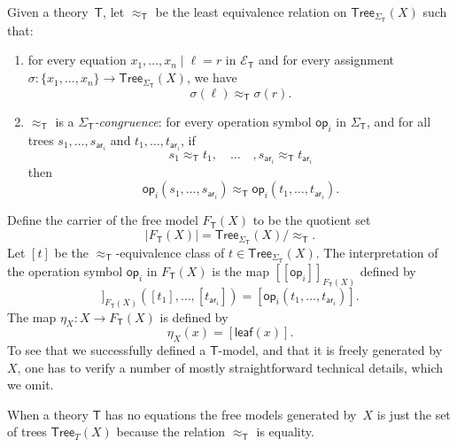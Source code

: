 \documentclass{amsart}
\newcommand{\theory}[1]{\mathsf{#1}} %
\newcommand{\signature}[1]{\Sigma_{\theory{#1}}} %
\newcommand{\equations}[1]{\mathcal{E}_{\theory{#1}}} %
\newcommand{\carrier}[1]{|#1|} %
\newcommand{\Free}[2]{F_{\theory{#1}}(#2)} %
\newcommand{\set}[1]{\{#1\}} %
\newcommand{\Tree}[2]{\mathsf{Tree}_{#1}(#2)} %
\newcommand{\leaf}[1]{\mathsf{leaf}(#1)} %
\newcommand{\op}[1]{\mathsf{op}_{#1}} %
\newcommand{\arity}[1]{\mathsf{ar}_{#1}} %
\newcommand{\sem}[1]{[\![#1]\!]} %
\begin{document}
Given a theory~$\theory{T}$, let $\approx_\theory{T}$ be the least equivalence relation on
$\Tree{\signature{T}}{X}$ such that:
%
\begin{enumerate}
\item for every equation $x_1, \ldots, x_n \mid \ell = r$ in $\equations{T}$ and for every
  assignment $\sigma : \set{x_1, \ldots, x_n} \to \Tree{\signature{T}}{X}$, we have
  \begin{equation*}
    \sigma(\ell) \approx_{\theory{T}} \sigma(r).
  \end{equation*}
\item $\approx_{\theory{T}}$ is a \emph{$\signature{T}$-congruence}: for every
  operation symbol $\op{i}$ in $\signature{T}$, and for all trees
  $s_1, \ldots, s_{\arity{i}}$ and $t_1, \ldots, t_{\arity{i}}$, if
  \begin{equation*}
    s_1 \approx_{\theory{T}} t_1,
    \quad \ldots \quad,
    s_{\arity{i}} \approx_{\theory{T}} t_{\arity{i}}
  \end{equation*}
  then
  \begin{equation*}
    \op{i}(s_1, \ldots, s_{\arity{i}}) \approx_{\theory{T}}
    \op{i}(t_1, \ldots, t_{\arity{i}}).
  \end{equation*}
\end{enumerate}
%
Define the carrier of the free model $\Free{T}{X}$ to be the quotient set
%
\begin{equation*}
  \carrier{\Free{T}{X}} = \Tree{\signature{T}}{X} / {\approx_{\theory{T}}}.
\end{equation*}
%
Let $[t]$ be the $\approx_{\theory{T}}$-equivalence class of
$t \in \Tree{\signature{T}}{X}$. The interpretation of the operation symbol $\op{i}$ in
  $\Free{T}{X}$ is the map $\sem{\op{i}}_{\Free{T}{X}}$ defined by
%
\begin{equation*}
  \sem{\op{i}}_{\Free{T}{X}}([t_1], \ldots, [t_{\arity{i}}]) =
  [\op{i}(t_1, \ldots, t_{\arity{i}})].
\end{equation*}
%
The map $\eta_X : X \to \Free{T}{X}$ is defined by
%
\begin{equation*}
  \eta_X(x) = [\leaf{x}].
\end{equation*}
%
To see that we successfully defined a $\theory{T}$-model, and that it is freely generated
by~$X$, one has to verify a number of mostly straightforward technical details, which we
omit.

When a theory $\theory{T}$ has no equations the free models generated by~$X$ is just the
set of trees $\Tree{T}{X}$ because the relation $\approx_{\theory{T}}$ is equality.
\end{document}
